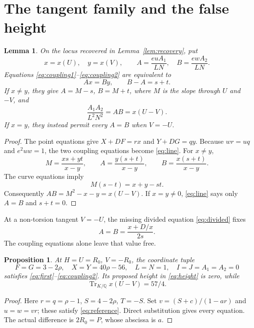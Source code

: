 \documentclass[11pt,a4paper]{article}
\newtheorem{lemma}[theorem]{Lemma}
\newtheorem{proposition}[theorem]{Proposition}
\newcommand{\Q}{\mathbb Q}\newcommand{\Z}{\mathbb Z}
\DeclareMathOperator{\Tr}{Tr}\DeclareMathOperator{\Res}{Res}
\begin{document}
\section{The tangent family and the false height}
\begin{lemma}\label{lem:line}
On the locus recovered in Lemma~\ref{lem:recovery}, put
\[
 x=x(U),\quad y=x(V),\qquad
 A=\frac{euA_1}{LN},\quad B=\frac{ewA_2}{LN}.
\]
Equations \eqref{eq:coupling1}--\eqref{eq:coupling2} are equivalent to
\begin{equation}\label{eq:line}
                         Ax=By,\qquad B-A=s+t.
\end{equation}
If $x\ne y$, they give $A=M-s$, $B=M+t$, where $M$ is the slope
through $U$ and $-V$, and
\begin{equation}\label{eq:height}
                     \frac{A_1A_2}{L^2N^2}=AB=x(U-V).
\end{equation}
If $x=y$, they instead permit every $A=B$ when $V=-U$.
\end{lemma}
\begin{proof}
The point equations give $X+DF=rx$ and $Y+DG=qy$.
Because $wr=uq$ and $e^2uw=1$, the two coupling equations become
\eqref{eq:line}. For $x\ne y$,
\[
 M=\frac{xs+yt}{x-y},\qquad
 A=\frac{y(s+t)}{x-y},\qquad
 B=\frac{x(s+t)}{x-y}.
\]
The curve equations imply
\begin{equation}\label{eq:divided}
                  M(s-t)=x+y-st.
\end{equation}
Consequently $AB=M^2-x-y=x(U-V)$. If $x=y\ne0$,
\eqref{eq:line} says only $A=B$ and $s+t=0$.
\end{proof}
At a non-torsion tangent $V=-U$, the missing divided equation
\eqref{eq:divided} fixes
\[
                         A=B=\frac{x+D/x}{2s}.
\]
The coupling equations alone leave that value free.

\begin{proposition}\label{prop:zero}
At $H=U=R_0$, $V=-R_0$, the coordinate tuple
\begin{equation}\label{eq:zerofixture}
 F=G=3-2\rho,\quad X=Y=40\rho-56,\quad
 L=N=1,\quad I=J=A_1=A_2=0
\end{equation}
satisfies \eqref{eq:first}--\eqref{eq:coupling2}.
Its proposed height in \eqref{eq:height} is zero, while
\[
                         \Tr_{K/\Q}x(U-V)=57/4.
\]
\end{proposition}
\begin{proof}
Here $r=q=\rho-1$, $S=4-2\rho$, $T=-S$.
Set $v=(S+c)/(1-ar)$ and $u=w=vr$; these satisfy
\eqref{eq:reference}. Direct substitution gives every equation.
The actual difference is $2R_0=P$, whose abscissa is $a$.
\end{proof}
\end{document}
